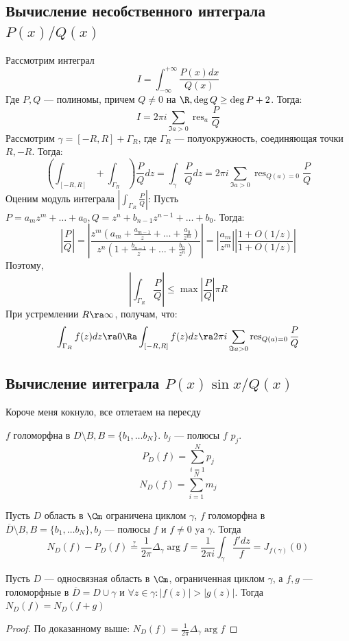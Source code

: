 \subsection{Вычисление несобственного интеграла \(P(x)/Q(x)\)}

Рассмотрим интеграл 
\[I = \int_{-\infty}^{+\infty} \frac{P(x)dx}{Q(x)}\]
Где \(P, Q\) --- полиномы, причем \(Q \ne 0\) на \(\R, \deg Q \ge \deg P + 2\). Тогда:
\[I = 2\pi i\sum_{\Im a > 0} \operatorname{res}_a \frac{P}{Q}\]
Рассмотрим \(\gamma = [-R, R] + \Gamma_R\), где \(\Gamma_R\) --- полуокружность, соединяющая точки \(R, -R\). Тогда:
\[\left( \int_{[-R, R]} + \int_{\Gamma_R}  \right)\frac{P}{Q}dz = \int_\gamma \frac{P}{Q}dz = 2\pi i \sum_{\Im a > 0}\operatorname{res}_{Q(a) = 0} \frac{P}{Q}\]
Оценим модуль интеграла \(\left| \int_{\Gamma_R} \frac{P}{Q} \right|\):
Пусть \(P = a_mz^m + \dots + a_0, Q = z^n + b_{n - 1}z^{n - 1} + \dots + b_0\). Тогда:
\[\left|\frac{P}{Q}\right| = \left|\frac{z^m\left( a_m + \frac{a_{m - 1}}{z} + \dots + \frac{a_0}{z^m} \right)}{z^n\left( 1 + \frac{b_{n - 1}}{z} + \dots + \frac{b_0}{z^n} \right)}\right| = \left| \frac{a_m}{z^m} \right|\left| \frac{1 + O(1/z)}{1 + O(1/z)} \right|\]
Поэтому, 
\[\left| \int_{\Gamma_R} \frac{P}{Q} \right| \le \max\left| \frac{P}{Q} \right|\pi R \]
При устремлении \(R \ra \infty\), получам, что:
\[\int_{\Gamma_R} f(z)dz \ra 0 \Ra \int_{[-R, R]} f(z)dz \ra 2\pi i \sum_{\Im a > 0}\operatorname{res}_{Q(a) = 0} \frac{P}{Q}\]

\subsection{Вычисление интеграла \(P(x)\sin x/Q(x)\)}

Короче меня кокнуло, все отлетаем на пересду


\(f\) голоморфна в \(D \setminus B, B = \{b_1, \dots b_N\}\). \(b_j\) --- полюсы \(f\) \(p_j\).
\[P_D(f) = \sum_{i = 1}^N p_j\]
\[N_D(f) = \sum_{i = 1}^N m_j\]

\begin{theorem}
    Пусть \(D\) область в \(\Cm\) ограничена циклом \(\gamma\), \(f\) голоморфна в \(\overline{D} \setminus B, B = \{b_1, \dots b_N\}, b_j\) --- полюсы \(f\) и \(f \ne 0\) yа \(\gamma\). Тогда
    \[N_D(f) - P_D(f) \stackrel{?}{=} \frac{1}{2\pi}\Delta_\gamma \operatorname{arg} f = \frac{1}{2\pi i} \int_\gamma \frac{f'dz}{f} = J_{f(\gamma)}(0)\]
\end{theorem}

\begin{theorem}[Руше]
    Пусть \(D\) --- односвязная область в \(\Cm\), ограниченная циклом \(\gamma\), а \(f, g\) --- голоморфные в \(\overline{D} = D \cup \gamma\) и \(\forall z \in \gamma: |f(z)| > |g(z)|\). Тогда \(N_D(f) = N_D(f + g)\)
\end{theorem}
\begin{proof}
    По доказанному выше: \(N_D(f) = \frac{1}{2\pi} \Delta_\gamma \arg f\)
\end{proof}